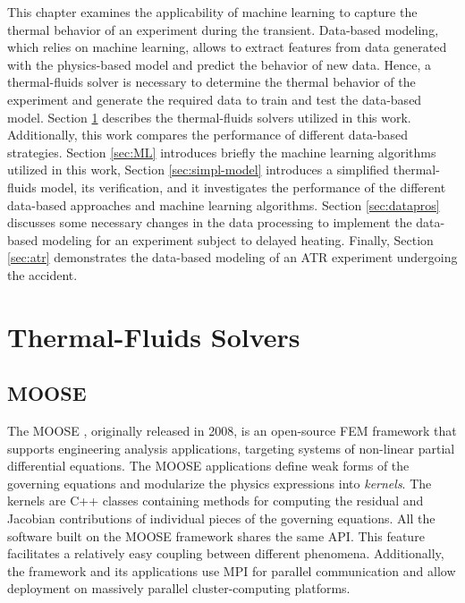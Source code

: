\label{ch:tf}

This chapter examines the applicability of machine learning to capture the thermal behavior of an experiment during the transient.
Data-based modeling, which relies on machine learning, allows to extract features from data generated with the physics-based model and predict the behavior of new data.
Hence, a thermal-fluids solver is necessary to determine the thermal behavior of the experiment and generate the required data to train and test the data-based model.
Section \ref{sec:tf} describes the thermal-fluids solvers utilized in this work.
Additionally, this work compares the performance of different data-based strategies.
Section \ref{sec:ML} introduces briefly the machine learning algorithms utilized in this work, Section \ref{sec:simpl-model} introduces a simplified thermal-fluids model, its verification, and it investigates the performance of the different data-based approaches and machine learning algorithms.
Section \ref{sec:datapros} discusses some necessary changes in the data processing to implement the data-based modeling for an experiment subject to delayed heating.
Finally, Section \ref{sec:atr} demonstrates the data-based modeling of an ATR experiment undergoing the accident.


\section{Thermal-Fluids Solvers}
\label{sec:tf}

\subsection{MOOSE}

The \gls*{MOOSE} \cite{gaston_moose_2009}, originally released in 2008, is an open-source \gls*{FEM} framework that supports engineering analysis applications, targeting systems of non-linear partial differential equations.
The MOOSE applications define weak forms of the governing equations and modularize the physics expressions into \textit{kernels}.
The kernels are C++ classes containing methods for computing the residual and Jacobian contributions of individual pieces of the governing equations.
All the software built on the MOOSE framework shares the same \gls*{API}.
This feature facilitates a relatively easy coupling between different phenomena.
Additionally, the framework and its applications use \gls*{MPI} for parallel communication and allow deployment on massively parallel cluster-computing platforms.

